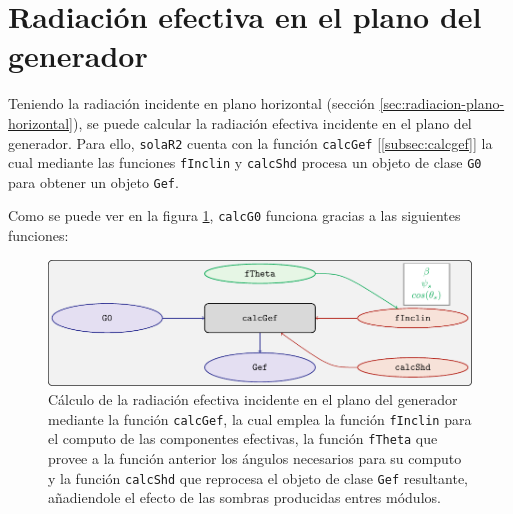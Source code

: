 \section{Radiación efectiva en el plano del generador}
\label{sec:org4839347}
\label{sec:radiacion-efectiva-plano-generador}
Teniendo la radiación incidente en plano horizontal (sección \ref{sec:radiacion-plano-horizontal}), se puede calcular la radiación efectiva incidente en el plano del generador. Para ello, \texttt{solaR2} cuenta con la función \texttt{calcGef} [\ref{subsec:calcgef}] la cual mediante las funciones \texttt{fInclin} y \texttt{calcShd} procesa un objeto de clase \texttt{G0} para obtener un objeto \texttt{Gef}.

Como se puede ver en la figura \ref{fig:calcgef}, \texttt{calcG0} funciona gracias a las siguientes funciones:
\begin{figure}[]
\centering
\includegraphics[keepaspectratio,width=\textwidth,height=0.5\textheight]{figuras/calcgef.pdf}
\caption{Cálculo de la radiación efectiva incidente en el plano del generador mediante la función \texttt{calcGef}, la cual emplea la función \texttt{fInclin} para el computo de las componentes efectivas, la función \texttt{fTheta} que provee a la función anterior los ángulos necesarios para su computo y la función \texttt{calcShd} que reprocesa el objeto de clase \texttt{Gef} resultante, añadiendole el efecto de las sombras producidas entres módulos. \label{fig:calcgef}}
\end{figure}
